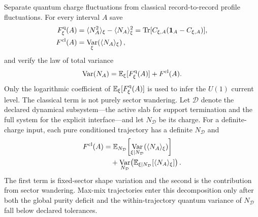\documentclass[aps,prx,twocolumn,floatfix,nofootinbib,superscriptaddress,longbibliography]{revtex4-2}
\DeclareMathOperator{\Var}{Var}
\newcommand{\E}{\mathbb{E}}
\newcommand{\qTr}{\operatorname{Tr}}
\begin{document}
Separate quantum charge fluctuations from classical record-to-record profile fluctuations.  For every interval
$A$ save
\begin{align}
 F_{\xi}^{\rm q}(A)
 &=\langle N_A^2\rangle_\xi-\langle N_A\rangle_\xi^2
   =\qTr[C_{\xi,A}(\mathbf{1}_A-C_{\xi,A})],\\
 F^{\rm cl}(A)
 &=\Var_\xi\!\left(\langle N_A\rangle_\xi\right),
\end{align}
and verify the law of total variance
\begin{equation}
 \Var(N_A)=\E_\xi[F_\xi^{\rm q}(A)]+F^{\rm cl}(A).
 \label{eq:total-charge-variance}
\end{equation}
Only the logarithmic coefficient of $\E_\xi[F_\xi^{\rm q}(A)]$ is used to infer the
$U(1)$ current level.  The classical term is not purely sector wandering.  Let
$\mathcal D$ denote the declared dynamical subsystem---the active slab for support
termination and the full system for the explicit interface---and let $N_{\mathcal D}$ be
its charge.  For a definite-charge input, each pure conditioned trajectory has a definite
$N_{\mathcal D}$ and
\begin{equation}
 \begin{aligned}
 F^{\rm cl}(A)
 &=\E_{N_{\mathcal D}}\!\left[
   \Var_{\xi|N_{\mathcal D}}\!\left(\langle N_A\rangle_\xi\right)\right]\\
 &\quad+\Var_{N_{\mathcal D}}\!\left(
   \E_{\xi|N_{\mathcal D}}[\langle N_A\rangle_\xi]\right).
 \end{aligned}
 \label{eq:classical-charge-decomposition}
\end{equation}
The first term is fixed-sector shape variation and the second is the contribution from
sector wandering.  Max-mix trajectories enter this decomposition only after both the
global purity deficit and the within-trajectory quantum variance of $N_{\mathcal D}$ fall
below declared tolerances.
\end{document}
